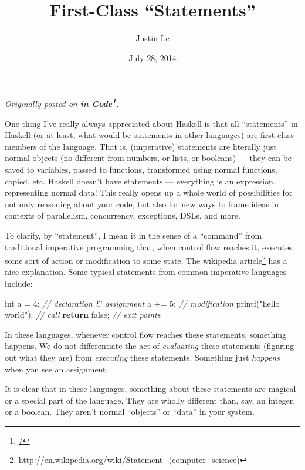 \documentclass[]{article}
\title{First-Class ``Statements''}
\author{Justin Le}
\date{July 28, 2014}
\newenvironment{Shaded}{}{}
\newcommand{\KeywordTok}[1]{\textcolor[rgb]{0.00,0.44,0.13}{\textbf{{#1}}}}
\newcommand{\DataTypeTok}[1]{\textcolor[rgb]{0.56,0.13,0.00}{{#1}}}
\newcommand{\DecValTok}[1]{\textcolor[rgb]{0.25,0.63,0.44}{{#1}}}
\newcommand{\StringTok}[1]{\textcolor[rgb]{0.25,0.44,0.63}{{#1}}}
\newcommand{\CommentTok}[1]{\textcolor[rgb]{0.38,0.63,0.69}{\textit{{#1}}}}
\newcommand{\NormalTok}[1]{{#1}}
\renewcommand{\href}[2]{#2\footnote{\url{#1}}}
\begin{document}
\maketitle

\emph{Originally posted on \textbf{\href{/}{in Code}}.}

One thing I've really always appreciated about Haskell is that all
``statements'' in Haskell (or at least, what would be statements in
other languages) are first-class members of the language. That is,
(imperative) statements are literally just normal objects (no different
from numbers, or lists, or booleans) --- they can be saved to variables,
passed to functions, transformed using normal functions, copied, etc.
Haskell doesn't have statements --- everything is an expression,
representing normal data! This really opens up a whole world of
possibilities for not only reasoning about your code, but also for new
ways to frame ideas in contexts of parallelism, concurrency, exceptions,
DSLs, and more.

To clarify, by ``statement'', I mean it in the sense of a ``command''
from traditional imperative programming that, when control flow reaches
it, executes some sort of action or modification to some state. The
\href{http://en.wikipedia.org/wiki/Statement_(computer_science)}{wikipedia
article} has a nice explanation. Some typical statements from common
imperative languages include:

\begin{Shaded}
\begin{Highlighting}[]
\DataTypeTok{int} \NormalTok{a = }\DecValTok{4}\NormalTok{;              }\CommentTok{// declaration & assignment}
\NormalTok{a += }\DecValTok{5}\NormalTok{;                 }\CommentTok{// modification}
\NormalTok{printf(}\StringTok{"hello world"}\NormalTok{);  }\CommentTok{// call}
\KeywordTok{return} \NormalTok{false;           }\CommentTok{// exit points}
\end{Highlighting}
\end{Shaded}

In these languages, whenever control flow reaches these statements,
something happens. We do not differentiate the act of \emph{evaluating}
these statements (figuring out what they are) from \emph{executing}
these statements. Something just \emph{happens} when you see an
assignment.

It is clear that in these languages, something about these statements
are magical or a special part of the language. They are wholly different
than, say, an integer, or a boolean. They aren't normal ``objects'' or
``data'' in your system.
\end{document}
